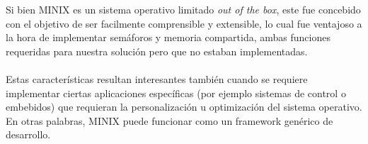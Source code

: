 Si bien MINIX es un sistema operativo limitado \emph{out of the box}, este fue concebido
 con el objetivo de ser facilmente comprensible y extensible, lo cual fue ventajoso a la hora
de implementar sem\'aforos y memoria compartida, ambas funciones requeridas para 
nuestra soluci\'on pero que no estaban implementadas.

\paragraph{}Estas caracter\'isticas resultan interesantes tambi\'en cuando se requiere 
implementar ciertas aplicaciones espec\'ificas (por ejemplo sistemas de control o embebidos) 
que requieran la personalizaci\'on u optimizaci\'on del sistema operativo. En otras palabras,
MINIX puede funcionar como un framework gen\'erico de desarrollo.
